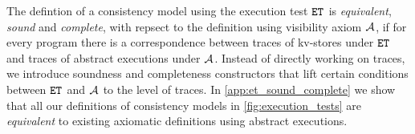 The defintion of a consistency model using the execution test \( \et \) is \emph{equivalent}, 
\ie \emph{sound} and \emph{complete},
with repsect to the definition using visibility axiom \( \visaxioms \),
if for every program there is a correspondence
between traces of kv-stores under \( \et \) and 
traces of abstract executions under \( \visaxioms \).
Instead of directly working on traces,
we introduce soundness and completeness constructors
that lift certain conditions between \( \et \) and \( \visaxioms \) to the level of traces. 
In \cref{app:et_sound_complete} we show that 
all our definitions of consistency models in \cref{fig:execution_tests} 
are \emph{equivalent} to existing axiomatic definitions using abstract executions.
